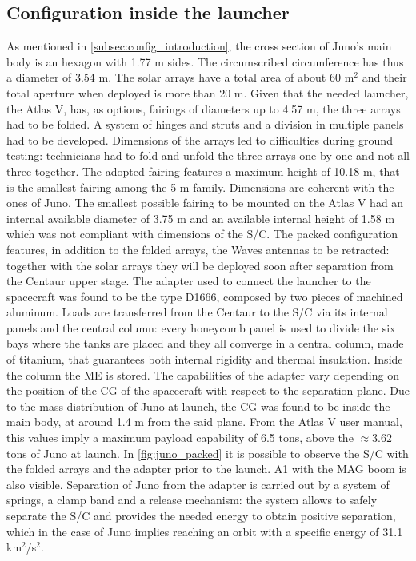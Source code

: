 \subsection{Configuration inside the launcher}
\label{subsec:config_launcher}

As mentioned in \autoref{subsec:config_introduction}, the cross section of Juno's main body is an hexagon with 1.77 m sides. The circumscribed circumference has thus a diameter of 3.54 m. The solar arrays have a total area of about 60 m$^2$ and their total aperture when deployed is more than 20 m.\cite{masses_ref} Given that the needed launcher, the Atlas V, has, as options, fairings of diameters up to 4.57 m, the three arrays had to be folded. A system of hinges and struts and a division in multiple panels had to be developed.\cite{solar_panels_coef} Dimensions of the arrays led to difficulties during ground testing: technicians had to fold and unfold the three arrays one by one and not all three together.\cite{solar_panels_testing} The adopted fairing features a maximum height of 10.18 m, that is the smallest fairing among the 5 m family.\cite{atlas_manual} Dimensions are coherent with the ones of Juno. The smallest possible fairing to be mounted on the Atlas V had an internal available diameter of 3.75 m and an available internal height of 1.58 m which was not compliant with dimensions of the S/C. 
The packed configuration features, in addition to the folded arrays, the Waves antennas to be retracted: together with the solar arrays they will be deployed soon after separation from the Centaur upper stage. The adapter used to connect the launcher to the spacecraft was found to be the type D1666, composed by two pieces of machined aluminum. Loads are transferred from the Centaur to the S/C via its internal panels and the central column: every honeycomb panel is used to divide the six bays where the tanks are placed and they all converge in a central column, made of titanium, that guarantees both internal rigidity and thermal insulation. Inside the column the ME is stored. The capabilities of the adapter vary depending on the position of the CG of the spacecraft with respect to the separation plane.\cite{atlas_manual} Due to the mass distribution of Juno at launch, the CG was found to be inside the main body, at around 1.4 m from the said plane. From the Atlas V user manual\cite{atlas_manual}, this values imply a maximum payload capability of 6.5 tons, above the $\approx 3.62$ tons of Juno at launch.\cite{masses_ref}
In \autoref{fig:juno_packed}\cite{foto_fairing} it is possible to observe the S/C with the folded arrays and the adapter prior to the launch. A1 with the MAG boom is also visible. 
Separation of Juno from the adapter is carried out by a system of springs, a clamp band and a release mechanism: the system allows to safely separate the S/C and provides the needed energy to obtain positive separation, which in the case of Juno implies reaching an orbit with a specific energy of 31.1 km$^2$/s$^2$. 